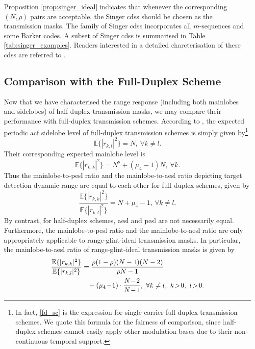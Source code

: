 \documentclass[journal,a4paper,10pt, romanappendices]{IEEEtran}
\begin{document}
Proposition \ref{prop:singer_ideal} indicates that whenever the corresponding $(N,\rho)$ pairs are acceptable, the Singer \acp{cds} should be chosen as the transmission masks. The family of Singer \acp{cds} incorporates all $m$-sequences and some Barker codes. A subset of Singer \acp{cds} is summarised in Table \ref{tab:singer_examples}. Readers interested in a detailed charcterisation of these \acp{cds} are referred to \cite{dillon2004new}.

\subsection{Comparison with the Full-Duplex Scheme}\label{ssec:fd_comparison}
Now that we have characterised the range response (including both mainlobes and sidelobes) of half-duplex transmission masks, we may compare their performance with full-duplex transmission schemes. According to \cite{FanLiu2024}, the expected periodic \ac{acf} sidelobe level of full-duplex transmission schemes is simply given by\footnote{In fact, \eqref{fd_sc} is the expression for single-carrier full-duplex transmission schemes. We quote this formula for the fairness of comparison, since half-duplex schemes cannot easily apply other modulation bases due to their non-continuous temporal support.}
\begin{equation}\label{fd_sc}
\mathbb{E}\{|r_{k,l}|^2\} = N,~\forall k\neq l.
\end{equation}
Their corresponding expected mainlobe level is
$$
\mathbb{E}\{|r_{k,k}|^2\} = N^2+(\mu_4-1)N,~\forall k.
$$
Thus the mainlobe-to-\ac{pesl} ratio and the mainlobe-to-\ac{aesl} ratio depicting target detection dynamic range are equal to each other for full-duplex schemes, given by
\begin{equation}
\frac{\mathbb{E}\{|r_{k,k}|^2\}}{\mathbb{E}\{|r_{k,l}|^2\}} = N+\mu_4-1,~\forall k\neq l.
\end{equation}
By contrast, for half-duplex schemes, \ac{aesl} and \ac{pesl} are not necessarily equal. Furthermore, the mainlobe-to-\ac{pesl} ratio and the mainlobe-to-\ac{aesl} ratio are only appropriately applicable to range-glint-ideal transmission masks. In particular, the mainlobe-to-\ac{aesl} ratio of range-glint-ideal transmission masks is given by
\begin{align}\label{atmr}
\frac{\mathbb{E}\{|r_{k,k}|^2\}}{\mathbb{E}\{|r_{k,l}|^2\}}&=\frac{\rho (1-\rho)(N-1)(N-2)}{\rho N-1} \nonumber\\
&\hspace{3mm}+ (\mu_4\!-\!1)\cdot\frac{N\!-\!2}{N\!-\!1},~\forall k\neq l,~k\!>\!0,~l\!>\!0.
\end{align}
\end{document}
